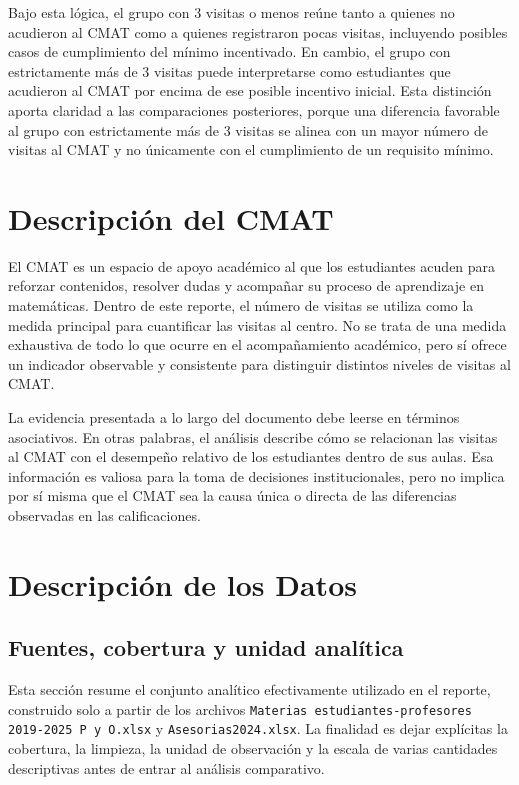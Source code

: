 \documentclass[10pt,letterpaper]{article} %
\numberwithin{figure}{subsection}
\begin{document}
Bajo esta lógica, el grupo con 3 visitas o menos reúne tanto a quienes no acudieron al CMAT como a quienes registraron pocas visitas, incluyendo posibles casos de cumplimiento del mínimo incentivado. En cambio, el grupo con estrictamente más de 3 visitas puede interpretarse como estudiantes que acudieron al CMAT por encima de ese posible incentivo inicial. Esta distinción aporta claridad a las comparaciones posteriores, porque una diferencia favorable al grupo con estrictamente más de 3 visitas se alinea con un mayor número de visitas al CMAT y no únicamente con el cumplimiento de un requisito mínimo.


\FloatBarrier
\section{Descripción del CMAT}
El CMAT es un espacio de apoyo académico al que los estudiantes acuden para reforzar contenidos, resolver dudas y acompañar su proceso de aprendizaje en matemáticas. Dentro de este reporte, el número de visitas se utiliza como la medida principal para cuantificar las visitas al centro. No se trata de una medida exhaustiva de todo lo que ocurre en el acompañamiento académico, pero sí ofrece un indicador observable y consistente para distinguir distintos niveles de visitas al CMAT.

La evidencia presentada a lo largo del documento debe leerse en términos asociativos. En otras palabras, el análisis describe cómo se relacionan las visitas al CMAT con el desempeño relativo de los estudiantes dentro de sus aulas. Esa información es valiosa para la toma de decisiones institucionales, pero no implica por sí misma que el CMAT sea la causa única o directa de las diferencias observadas en las calificaciones.



\FloatBarrier
\section{Descripción de los Datos}

\subsection{Fuentes, cobertura y unidad analítica}
Esta sección resume el conjunto analítico efectivamente utilizado en el reporte, construido solo a partir de los archivos \texttt{Materias estudiantes-profesores 2019-2025 P y O.xlsx} y \texttt{Asesorias2024.xlsx}. La finalidad es dejar explícitas la cobertura, la limpieza, la unidad de observación y la escala de varias cantidades descriptivas antes de entrar al análisis comparativo.
\end{document}
